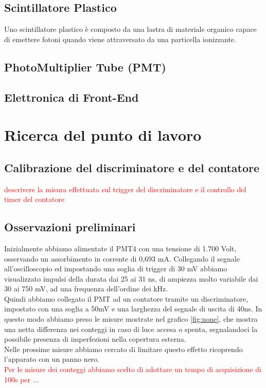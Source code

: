 \documentclass[a4paper,10pt]{article}
\newcommand{\note}[1]{\textcolor{red}{#1}}
\begin{document}
\label{sec:apparato} 
\subsection{Scintillatore Plastico}
Uno scintillatore plastico è composto da una lastra di materiale organico capace di emettere fotoni quando viene attraversato da una particella ionizzante. 

\subsection{PhotoMultiplier Tube (PMT)}

\subsection{Elettronica di Front-End}




\section{Ricerca del punto di lavoro}
\label{sec:puntodilavoro} 
\subsection{Calibrazione del discriminatore e del contatore}
\note{descrivere la misura effettuata sul trigger del discriminatore e il controllo del timer del contatore}

\subsection{Osservazioni preliminari}
Inizialmente abbiamo alimentate il PMT4 con una tensione di 1.700 Volt, osservando un assorbimento in corrente di 0,693 mA. Collegando il segnale all'oscilloscopio ed impostando una soglia di trigger di 30 mV abbiamo visualizzato impulsi della durata dai 25 ai 31 ns, di ampiezza molto variabile dai 30 ai 750 mV, ad una frequenza dell'ordine dei kHz.
\\
Quindi abbiamo collegato il PMT ad un contatore tramite un discriminatore, impostato con una soglia a 50mV e una larghezza del segnale di uscita di 40ns. In questo modo abbiamo preso le misure mostrate nel grafico \ref{fig:none}, che mostra una netta differenza nei conteggi in caso di luce accesa o spenta, segnalandoci la possibile presenza di imperfezioni nella copertura esterna.
\\
Nelle prossime misure abbiamo cercato di limitare questo effetto ricoprendo l'apparato con un panno nero.
\\
\note{Per le misure dei conteggi abbiamo scelto di adottare un tempo di acquisizione di 100s per ...}
\end{document}
